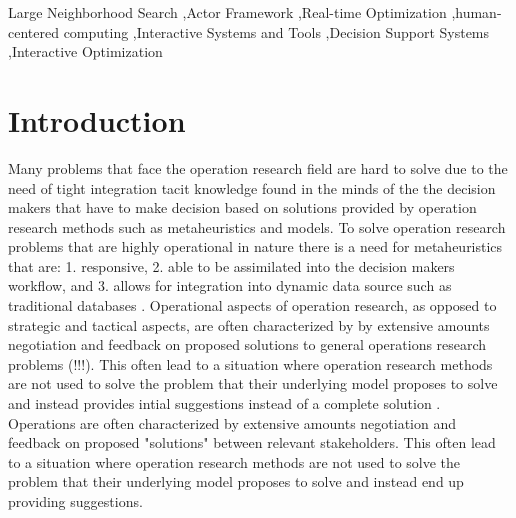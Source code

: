 \documentclass[preprint,12pt,authoryear]{elsarticle}
\begin{document}
\begin{frontmatter}
\begin{keyword}
Large Neighborhood Search \sep Actor Framework \sep Real-time Optimization \sep human-centered computing \sep Interactive Systems and Tools \sep Decision Support Systems \sep Interactive Optimization




\end{keyword}

\end{frontmatter}



\section{Introduction}
\label{sec1}

Many problems that face the operation research field are hard to solve due to the need of tight integration tacit knowledge found in the minds of the 
the decision makers that have to make decision based on solutions provided by operation research methods such as metaheuristics and models. 
To solve operation research problems that are highly operational in nature there is a need for metaheuristics that are: 1.  
responsive, 2. able to be assimilated into the decision makers workflow, and 3. allows for integration into dynamic data source such as traditional databases \citep{meignan_review_2015}. 
Operational aspects of operation research, as opposed to strategic and tactical aspects, are often characterized by by extensive amounts negotiation and feedback on 
proposed solutions to general operations research problems (!!!). This often lead to a situation
where operation research methods are not used to solve the problem that their underlying model proposes to solve and instead provides intial suggestions 
instead of a complete solution \cite{meignan_review_2015} . Operations are often
characterized by extensive amounts negotiation and feedback on proposed "solutions" between relevant stakeholders. This often lead to a situation
where operation research methods are not used to solve the problem that their underlying model proposes to solve and instead end up providing suggestions. 
\end{document}

